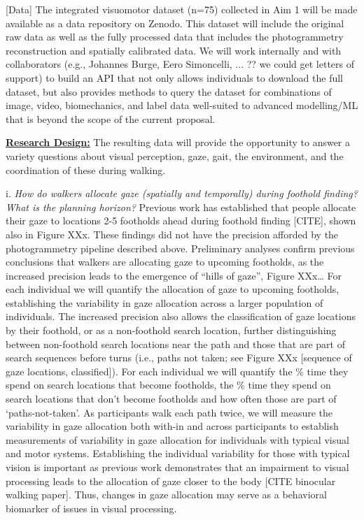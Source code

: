[Data] The integrated visuomotor dataset (n=75) collected in Aim 1 will be made available as a data repository on Zenodo. This dataset will include the original raw data as well as the fully processed data that includes the photogrammetry reconstruction and spatially calibrated data.  We will work internally and with collaborators (e.g., Johannes Burge, Eero Simoncelli, ... ?? we could get letters of support) to build an API that not only allows individuals to download the full dataset, but also provides methods to query the dataset for combinations of image, video, biomechanics, and label data well-suited to advanced modelling/ML that is beyond the scope of the current proposal.

\noindent\underline{\textbf{Research Design:}} The resulting data will provide the opportunity to answer a variety questions about visual perception, gaze, gait, the environment, and the coordination of these during walking.

i. \emph{How do walkers allocate gaze (spatially and temporally) during foothold finding? What is the planning horizon?} Previous work has established that people allocate their gaze to locations 2-5 footholds ahead during foothold finding [CITE], shown also in Figure XXx. These findings did not have the precision afforded by the photogrammetry pipeline described above. Preliminary analyses confirm previous conclusions that walkers are allocating gaze to upcoming footholds, as the increased precision leads to the emergence of ``hills of gaze'',
Figure XXx\ldots{} For each individual we will quantify the allocation of gaze to upcoming footholds, establishing the variability in gaze allocation across a larger population of individuals. The increased precision also allows the classification of gaze locations by their
foothold, or as a non-foothold search location, further distinguishing between non-foothold search locations near the path and those that are part of search sequences before turns (i.e., paths not taken; see Figure XXx [sequence of gaze locations, classified]). For each individual we will quantify the \% time they spend on search locations that become
footholds, the \% time they spend on search locations that don't become footholds and how often those are part of `paths-not-taken'. As participants walk each path twice, we will measure the variability in gaze allocation both with-in and across participants to establish measurements of variability in gaze allocation for individuals with typical visual and motor systems. Establishing the individual variability for those with typical vision is important as previous work demonstrates that an impairment to visual processing leads to the allocation of gaze closer to the body [CITE binocular walking paper]. Thus, changes in gaze allocation may serve as a behavioral biomarker of issues in visual processing.

